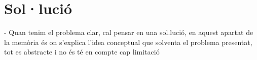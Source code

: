 \chapter{Sol·lució}

        - Quan tenim el problema clar, cal pensar en una
        sol.lució, en aquest apartat de la memòria és on
        s'explica l'idea conceptual que solventa el
        problema presentat, tot es abstracte i no és té en
        compte cap limitació
